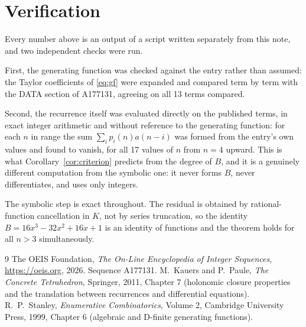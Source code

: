 \documentclass[11pt,a4paper]{article}
\theoremstyle{plain}
\theoremstyle{definition}
\begin{document}
\section{Verification}

Every number above is an output of a script written separately from this note, and two
independent checks were run.

First, the generating function was checked against the entry rather than assumed: the
Taylor coefficients of \eqref{eq:gf} were expanded and compared term by term with the DATA
section of A177131, agreeing on all 13 terms compared.

Second, the recurrence itself was evaluated directly on the published terms, in exact
integer arithmetic and without reference to the generating function: for each $n$ in range
the sum $\sum_{i}p_{i}(n)a(n-i)$ was formed from the entry's own values and found to
vanish, for all 17 values of $n$ from $n=4$ upward. This is what
Corollary~\ref{cor:criterion} predicts from the degree of $B$, and it is a genuinely
different computation from the symbolic one: it never forms $B$, never differentiates, and
uses only integers.

The symbolic step is exact throughout. The residual is obtained by rational-function
cancellation in $K$, not by series truncation, so the identity $B=16 x^{3} - 32 x^{2} + 16 x + 1$ is an
identity of functions and the theorem holds for all $n>3$ simultaneously.

\begin{thebibliography}{9}
 The OEIS Foundation, \emph{The On-Line Encyclopedia of Integer Sequences},
\url{https://oeis.org}, 2026. Sequence A177131.
 M.~Kauers and P.~Paule, \emph{The Concrete Tetrahedron}, Springer, 2011,
Chapter 7 (holonomic closure properties and the translation between recurrences and
differential equations).
 R.~P.~Stanley, \emph{Enumerative Combinatorics}, Volume 2, Cambridge
University Press, 1999, Chapter 6 (algebraic and D-finite generating functions).
\end{thebibliography}
\end{document}
